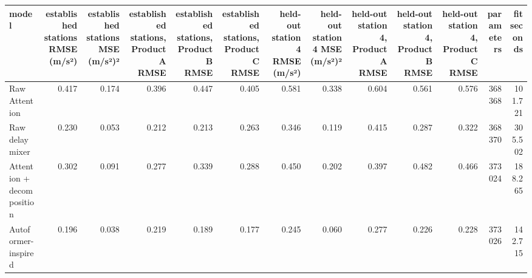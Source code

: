 \begin{tabular}{lrrrrrrrrrrrr}
\toprule
model & established stations RMSE (m/s²) & established stations MSE (m/s²)² & established stations, Product A RMSE & established stations, Product B RMSE & established stations, Product C RMSE & held-out station 4 RMSE (m/s²) & held-out station 4 MSE (m/s²)² & held-out station 4, Product A RMSE & held-out station 4, Product B RMSE & held-out station 4, Product C RMSE & parameters & fit seconds \\
\midrule
Raw Attention & 0.417 & 0.174 & 0.396 & 0.447 & 0.405 & 0.581 & 0.338 & 0.604 & 0.561 & 0.576 & 368368 & 101.721 \\
Raw delay mixer & 0.230 & 0.053 & 0.212 & 0.213 & 0.263 & 0.346 & 0.119 & 0.415 & 0.287 & 0.322 & 368370 & 305.502 \\
Attention + decomposition & 0.302 & 0.091 & 0.277 & 0.339 & 0.288 & 0.450 & 0.202 & 0.397 & 0.482 & 0.466 & 373024 & 188.265 \\
Autoformer-inspired & 0.196 & 0.038 & 0.219 & 0.189 & 0.177 & 0.245 & 0.060 & 0.277 & 0.226 & 0.228 & 373026 & 142.715 \\
\bottomrule
\end{tabular}
